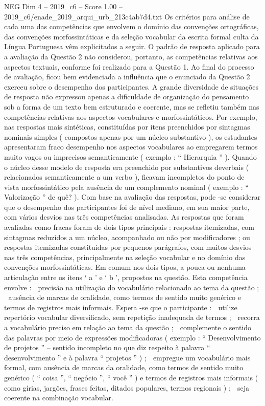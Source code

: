 \begin{textsample}{NEG Dim 4 – 2019\_c6 – Score 1.00 – 2019\_c6/enade\_2019\_arqui\_urb\_213c4ab7d4.txt}
Os critérios para análise de cada uma das competências que envolvem o domínio das convenções ortográficas, das convenções morfossintáticas e da seleção vocabular da escrita formal culta da Língua Portuguesa vêm explicitados a seguir.
O padrão de resposta aplicado para a avaliação da Questão 2 não considerou, portanto, as competências relativas aos aspectos textuais, conforme foi realizado para a Questão 1.
Ao final do processo de avaliação, ficou bem evidenciada a influência que o enunciado da Questão 2 exerceu sobre o desempenho dos participantes.
A grande diversidade de situações de resposta não expressou apenas a dificuldade de organização do pensamento sob a forma de um texto bem estruturado e coerente, mas se refletiu também nas competências relativas aos aspectos vocabulares e morfossintáticos.
Por exemplo, nas respostas mais sintéticas, constituídas por itens preenchidos por sintagmas nominais simples ( compostos apenas por um núcleo substantivo ), os estudantes apresentaram fraco desempenho nos aspectos vocabulares ao empregarem termos muito vagos ou imprecisos semanticamente ( exemplo : “ Hierarquia ” ).
Quando o núcleo desse modelo de resposta era preenchido por substantivos deverbais ( relacionados semanticamente a um verbo ), ficavam incompletos do ponto de vista morfossintático pela ausência de um complemento nominal ( exemplo : “ Valorização ” de quê? ).
Com base na avaliação das respostas, pode -se considerar que o desempenho dos participantes foi de nível mediano, em sua maior parte, com vários desvios nas três competências analisadas.
As respostas que foram avaliadas como fracas foram de dois tipos principais : respostas itemizadas, com sintagmas reduzidos a um núcleo, acompanhado ou não por modificadores ; ou respostas itemizadas constituídas por pequenos parágrafos, com muitos desvios nas três competências, principalmente na seleção vocabular e no domínio das convenções morfossintáticas.
Em comum nos dois tipos, a pouca ou nenhuma articulação entre os itens ‘ a ’ e ‘ b ’, propostos na questão.
Esta competência envolve :  precisão na utilização do vocabulário relacionado ao tema da questão ;  ausência de marcas de oralidade, como termos de sentido muito genérico e termos de registros mais informais.
Espera -se que o participante :  utilize repertório vocabular diversificado, sem repetição inadequada de termos ;  recorra a vocabulário preciso em relação ao tema da questão ;  complemente o sentido das palavras por meio de expressões modificadoras ( exemplo : “ Desenvolvimento de projetos ” – sentido incompleto no que diz respeito à palavra “ desenvolvimento ” e à palavra “ projetos ” ) ;  empregue um vocabulário mais formal, com ausência de marcas da oralidade, como termos de sentido muito genérico ( “ coisa ”, “ negócio ”, “ você ” ) e termos de registros mais informais ( como gírias, jargões, frases feitas, ditados populares, termos regionais ) ;  seja coerente na combinação vocabular.

\end{textsample}
